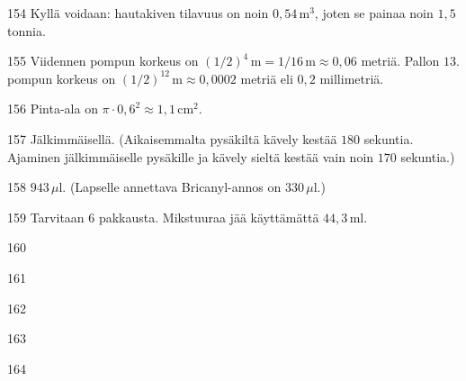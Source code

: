 \begin{Vastaus}{154}
Kyllä voidaan: hautakiven tilavuus on noin $0,54$\,m$^3$, joten se painaa noin $1,5$ tonnia.
	
\end{Vastaus}
\begin{Vastaus}{155}
        Viidennen pompun korkeus on $(1/2)^4\,\textrm{m}=1/16\,\textrm{m}\approx 0,06$ metriä. Pallon $13$. pompun korkeus on $(1/2)^{12}\,\textrm{m} \approx 0,0002$ metriä eli $0,2$ millimetriä.
        
\end{Vastaus}
\begin{Vastaus}{156}
        Pinta-ala on $\pi \cdot 0,6^2 \approx 1,1\,$cm$^2$.
        
\end{Vastaus}
\begin{Vastaus}{157}
	Jälkimmäisellä. (Aikaisemmalta pysäkiltä kävely kestää $180$ sekuntia. Ajaminen jälkimmäiselle pysäkille ja kävely sieltä kestää vain noin $170$ sekuntia.)
	
\end{Vastaus}
\begin{Vastaus}{158}
$943$\,$\mu$l. (Lapselle annettava Bricanyl-annos on $330$\,$\mu$l.) %
	
\end{Vastaus}
\begin{Vastaus}{159}
Tarvitaan $6$ pakkausta. Mikstuuraa jää käyttämättä $44,3$\,ml.
 
\end{Vastaus}
\begin{Vastaus}{160}
	
\end{Vastaus}
\begin{Vastaus}{161}
	
\end{Vastaus}
\begin{Vastaus}{162}
	
\end{Vastaus}
\begin{Vastaus}{163}
	
\end{Vastaus}
\begin{Vastaus}{164}
	
\end{Vastaus}
